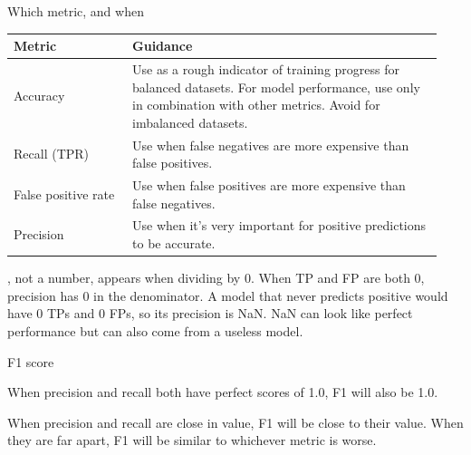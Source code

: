 \begin{frame}{Which metric, and when}
  \begin{withmargin}
    \begin{tdmain}
      \footnotesize
      \begin{tabular}{@{}p{0.26\linewidth}p{0.68\linewidth}@{}}
        \toprule
        \textbf{Metric} & \textbf{Guidance}\\
        \midrule
        Accuracy & Use as a rough indicator of training progress for balanced
          datasets. For model performance, use only in combination with other
          metrics. Avoid for imbalanced datasets.\\[0.4em]
        Recall (TPR) & Use when false negatives are more expensive than false
          positives.\\[0.4em]
        False positive rate & Use when false positives are more expensive than
          false negatives.\\[0.4em]
        Precision & Use when it's very important for positive predictions to be
          accurate.\\
        \bottomrule
      \end{tabular}
    \end{tdmain}
    \begin{tdmargin}
      , not a number, appears when dividing by 0. When TP and FP are
      both 0, precision has 0 in the denominator. A model that never predicts
      positive would have 0 TPs and 0 FPs, so its precision is NaN. NaN can look
      like perfect performance but can also come from a useless model.
    \end{tdmargin}
  \end{withmargin}
\end{frame}

\begin{frame}{F1 score}
  \begin{withmargin}
    \begin{tdmargin}
      When precision and recall both have perfect scores of 1.0, F1 will also be
      1.0.
      \par\medskip
      When precision and recall are close in value, F1 will be close to their
      value. When they are far apart, F1 will be similar to whichever metric is
      worse.
    \end{tdmargin}
  \end{withmargin}
\end{frame}

